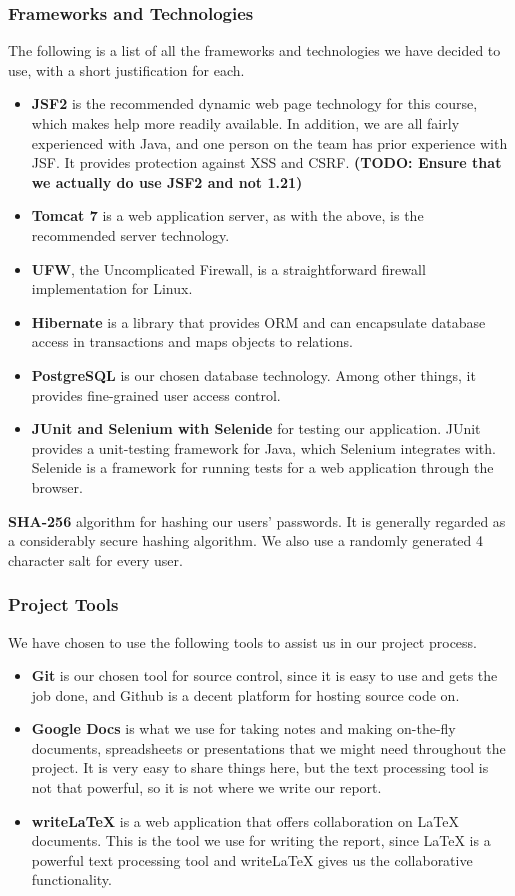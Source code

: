 \documentclass[a4paper]{article}
\begin{document}
\subsubsection{Frameworks and Technologies}
The following is a list of all the frameworks and technologies we have decided to use, with a short justification for each.
\begin{itemize}
\item \textbf{JSF2} is the recommended dynamic web page technology for this course, which makes help more readily available. In addition, we are all fairly experienced with Java, and one person on the team has prior experience with JSF. It provides protection against XSS and CSRF. \textbf{(TODO: Ensure that we actually do use JSF2 and not 1.21)}
\item \textbf{Tomcat 7} is a web application server, as with the above, is the recommended server technology.
\item \textbf{UFW}, the Uncomplicated Firewall, is a straightforward firewall implementation for Linux.
\item \textbf{Hibernate} is a library that provides ORM and can encapsulate database access in transactions and maps objects to relations.
\item \textbf{PostgreSQL} is our chosen database technology. Among other things, it provides fine-grained user access control.
\item \textbf{JUnit and Selenium with Selenide} for testing our application. JUnit provides a unit-testing framework for Java, which Selenium integrates with. Selenide is a framework for running tests for a web application through the browser.
\end{itemize}


\textbf{SHA-256} algorithm for hashing our users' passwords. It is generally regarded as a considerably secure hashing algorithm.
We also use a randomly generated 4 character salt for every user.

\subsubsection{Project Tools}
We have chosen to use the following tools to assist us in our project process.
\begin{itemize}
\item \textbf{Git} is our chosen tool for source control, since it is easy to use and gets the job done, and Github is a decent platform for hosting source code on.
\item \textbf{Google Docs} is what we use for taking notes and making on-the-fly documents, spreadsheets or presentations that we might need throughout the project. It is very easy to share things here, but the text processing tool is not that powerful, so it is not where we write our report.
\item \textbf{writeLaTeX} is a web application that offers collaboration on LaTeX documents. This is the tool we use for writing the report, since LaTeX is a powerful text processing tool and writeLaTeX gives us the collaborative functionality.
\end{itemize}
\end{document}
